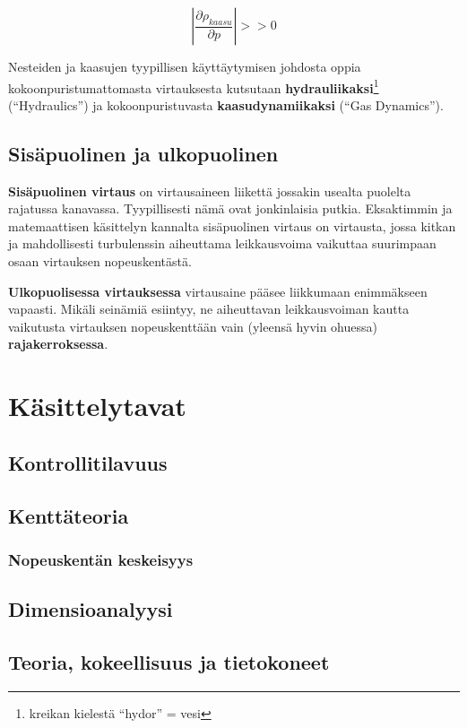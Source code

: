 \documentclass[12pt,a4paper,finnish]{book}
\begin{document}
\begin{equation}
 \left|\frac{\partial \rho_{kaasu}}{\partial p}\right| >> 0
\end{equation}

Nesteiden ja kaasujen tyypillisen käyttäytymisen johdosta oppia kokoonpuristumattomasta virtauksesta 
kutsutaan \textbf{hydrauliikaksi}\footnote{kreikan kielestä ``hydor'' = vesi} (``Hydraulics'') ja 
kokoonpuristuvasta \textbf{kaasudynamiikaksi} (``Gas Dynamics'').

\section{Sisäpuolinen ja ulkopuolinen}
\textbf{Sisäpuolinen virtaus} on virtausaineen liikettä jossakin usealta puolelta rajatussa kanavassa. 
Tyypillisesti nämä ovat jonkinlaisia putkia. Eksaktimmin ja matemaattisen käsittelyn kannalta 
sisäpuolinen virtaus on virtausta, jossa kitkan ja mahdollisesti turbulenssin aiheuttama 
leikkausvoima vaikuttaa suurimpaan osaan virtauksen nopeuskentästä.

\textbf{Ulkopuolisessa virtauksessa} virtausaine pääsee liikkumaan enimmäkseen vapaasti. Mikäli 
seinämiä esiintyy, ne aiheuttavan leikkausvoiman kautta vaikutusta virtauksen nopeuskenttään 
vain (yleensä hyvin ohuessa) \textbf{rajakerroksessa}. 


\chapter{Käsittelytavat}
\section{Kontrollitilavuus}
\section{Kenttäteoria}
\subsection{Nopeuskentän keskeisyys}
\section{Dimensioanalyysi}
\section{Teoria, kokeellisuus ja tietokoneet}
\end{document}
